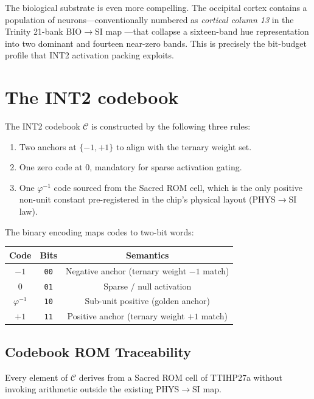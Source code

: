 The biological substrate is even more compelling. The occipital cortex
contains a population of neurons---conventionally numbered as
\emph{cortical column 13} in the Trinity 21-bank BIO$\to$SI map
\cite{Hubel1962Receptive,LivingstoneHubel}---that collapse a sixteen-band hue
representation into two dominant and fourteen near-zero bands. This is
precisely the bit-budget profile that INT2 activation packing exploits.

\section{The INT2 codebook}

The INT2 codebook $\mathcal{C}$ is constructed by the following three rules:

\begin{enumerate}
  \item Two anchors at $\{-1, +1\}$ to align with the ternary weight set.
  \item One zero code at $0$, mandatory for sparse activation gating.
  \item One $\varphi^{-1}$ code sourced from the Sacred ROM cell, which is
        the only positive non-unit constant pre-registered in the chip's
        physical layout (PHYS$\to$SI law).
\end{enumerate}

The binary encoding maps codes to two-bit words:

\begin{center}
\begin{tabular}{c|c|c}
  Code & Bits & Semantics \\
  \hline
  $-1$ & \texttt{00} & Negative anchor (ternary weight $-1$ match) \\
  $0$ & \texttt{01} & Sparse / null activation \\
  $\varphi^{-1}$ & \texttt{10} & Sub-unit positive (golden anchor) \\
  $+1$ & \texttt{11} & Positive anchor (ternary weight $+1$ match) \\
\end{tabular}
\end{center}

\subsection{Codebook ROM Traceability}


\begin{theorem}
\label{thm:107-1-rom-trace}
Every element of $\mathcal{C}$ derives from a Sacred ROM cell of TTIHP27a
without invoking arithmetic outside the existing PHYS$\to$SI map.
\end{theorem}

